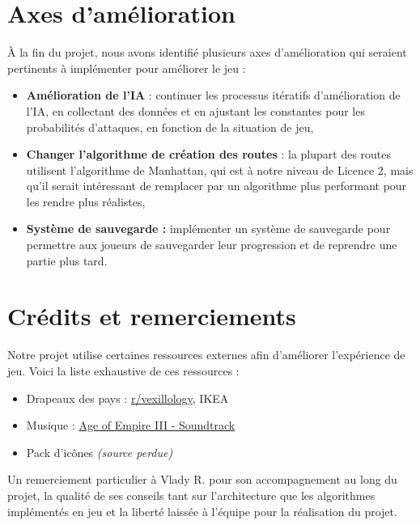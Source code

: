 \documentclass{article}
\begin{document}
\section{Axes d'amélioration}
À la fin du projet, nous avons identifié plusieurs axes d'amélioration qui seraient pertinents à implémenter pour améliorer le jeu :
\begin{itemize}
    \item \textbf{Amélioration de l'IA} : continuer les processus itératifs d'amélioration de l'IA, en collectant des données et en ajustant les constantes pour les probabilités d'attaques, en fonction de la situation de jeu,
    \item \textbf{Changer l'algorithme de création des routes} : la plupart des routes utilisent l'algorithme de Manhattan, qui est à notre niveau de Licence 2, mais qu'il serait intéressant de remplacer par un algorithme plus performant pour les rendre plus réalistes,
    \item \textbf{Système de sauvegarde :} implémenter un système de sauvegarde pour permettre aux joueurs de sauvegarder leur progression et de reprendre une partie plus tard.
\end{itemize}

\section{Crédits et remerciements}
Notre projet utilise certaines ressources externes afin d'améliorer l'expérience de jeu. Voici la liste exhaustive de ces ressources :
\begin{itemize}
    \item Drapeaux des pays : \href{https://www.reddit.com/r/vexillology/comments/svmfu6/i_created_a_bunch_of_flags_for_the_countries_in_a/}{r/vexillology}, IKEA
    \item Musique : \href{https://www.youtube.com/watch?v=Az6vUs2Cj1M}{Age of Empire III - Soundtrack}
    \item Pack d'icônes \textit{(source perdue)}
\end{itemize}

\noindent Un remerciement particulier à Vlady R. pour son accompagnement au long du projet, la qualité de ses conseils tant sur l'architecture que les algorithmes implémentés en jeu et la liberté laissée à l'équipe pour la réalisation du projet.
\end{document}
